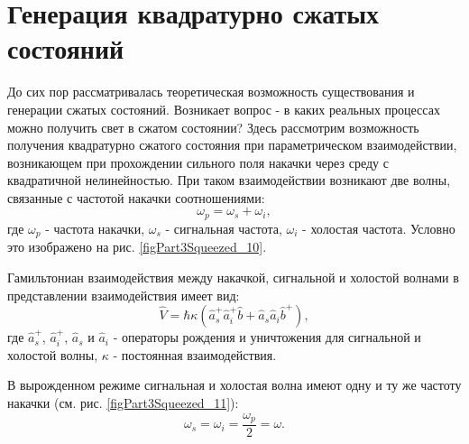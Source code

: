 \section{Генерация квадратурно сжатых состояний}
\label{pNonClassGenerSqueezed}
До сих пор рассматривалась теоретическая возможность существования и
генерации сжатых состояний. Возникает вопрос - в каких реальных
процессах можно получить свет в сжатом состоянии? Здесь рассмотрим
возможность получения квадратурно сжатого состояния при
параметрическом взаимодействии, возникающем при прохождении сильного
поля накачки через среду с квадратичной нелинейностью. При таком
взаимодействии возникают две волны, связанные с частотой накачки
соотношениями:
\begin{equation}
\omega_p = \omega_s + \omega_i,
\nonumber
\end{equation}
где $\omega_p$ - частота накачки, $\omega_s$ - сигнальная частота,
$\omega_i$ - холостая частота. Условно это изображено на рис. 
\ref{figPart3Squeezed_10}.



Гамильтониан взаимодействия между накачкой, сигнальной и холостой
волнами в представлении взаимодействия имеет вид:
\begin{equation}
\hat{V} = \hbar \kappa \left(
\hat{a}^{+}_s \hat{a}^{+}_i \hat{b} + 
\hat{a}_s \hat{a}_i \hat{b}^{+}
\right),
\label{eqPart3Squeezed30}
\end{equation}
где $\hat{a}^{+}_s$, $\hat{a}^{+}_i$, 
$\hat{a}_s$ и $\hat{a}_i$ - операторы рождения и уничтожения для
сигнальной и холостой волны, $\kappa$ - постоянная взаимодействия.



В вырожденном режиме сигнальная и холостая волна имеют одну и ту же
частоту накачки (см. рис. \ref{figPart3Squeezed_11}):
\[
\omega_s = \omega_i = \frac{\omega_p}{2} = \omega.
\]

